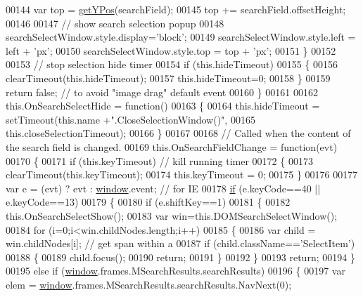 \begin{DoxyCode}
00144       var top  = \hyperlink{search_8js_a8d7b405228661d7b6216b6925d2b8a69}{getYPos}(searchField);
00145       top += searchField.offsetHeight;
00146 
00147       \textcolor{comment}{// show search selection popup}
00148       searchSelectWindow.style.display=\textcolor{stringliteral}{'block'};
00149       searchSelectWindow.style.left =  left + \textcolor{stringliteral}{'px'};
00150       searchSelectWindow.style.top  =  top  + \textcolor{stringliteral}{'px'};
00151     \}
00152 
00153     \textcolor{comment}{// stop selection hide timer}
00154     \textcolor{keywordflow}{if} (this.hideTimeout) 
00155     \{
00156       clearTimeout(this.hideTimeout);
00157       this.hideTimeout=0;
00158     \}
00159     \textcolor{keywordflow}{return} \textcolor{keyword}{false}; \textcolor{comment}{// to avoid "image drag" default event}
00160   \}
00161 
00162   this.OnSearchSelectHide = \textcolor{keyword}{function}()
00163   \{
00164     this.hideTimeout = setTimeout(this.name +\textcolor{stringliteral}{".CloseSelectionWindow()"},
00165                                   this.closeSelectionTimeout);
00166   \}
00167 
00168   \textcolor{comment}{// Called when the content of the search field is changed.}
00169   this.OnSearchFieldChange = \textcolor{keyword}{function}(evt)
00170   \{
00171     \textcolor{keywordflow}{if} (this.keyTimeout) \textcolor{comment}{// kill running timer}
00172     \{
00173       clearTimeout(this.keyTimeout);
00174       this.keyTimeout = 0;
00175     \}
00176 
00177     var e  = (evt) ? evt : \hyperlink{jquery_8js_a04a8a2bbfa9c15500892b8e5033d625b}{window}.event; \textcolor{comment}{// for IE}
00178     \hyperlink{jquery_8js_a9db6d45a025ad692282fe23e69eeba43}{if} (e.keyCode==40 || e.keyCode==13)
00179     \{
00180       \textcolor{keywordflow}{if} (e.shiftKey==1)
00181       \{
00182         this.OnSearchSelectShow();
00183         var win=this.DOMSearchSelectWindow(); 
00184         \textcolor{keywordflow}{for} (i=0;i<win.childNodes.length;i++)
00185         \{
00186           var child = win.childNodes[i]; \textcolor{comment}{// get span within a}
00187           \textcolor{keywordflow}{if} (child.className==\textcolor{stringliteral}{'SelectItem'})
00188           \{
00189             child.focus();
00190             \textcolor{keywordflow}{return};
00191           \}
00192         \}
00193         \textcolor{keywordflow}{return};
00194       \}
00195       \textcolor{keywordflow}{else} \textcolor{keywordflow}{if} (\hyperlink{jquery_8js_a04a8a2bbfa9c15500892b8e5033d625b}{window}.frames.MSearchResults.searchResults)
00196       \{
00197         var elem = \hyperlink{jquery_8js_a04a8a2bbfa9c15500892b8e5033d625b}{window}.frames.MSearchResults.searchResults.NavNext(0);

\end{DoxyCode}
